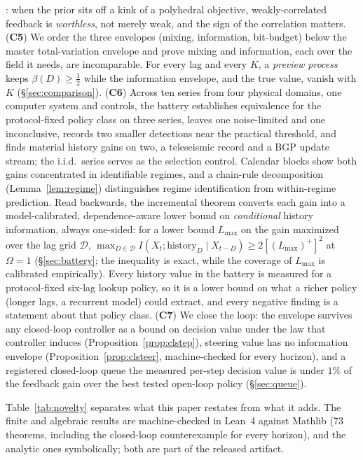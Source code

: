 \documentclass[acmsmall,screen,review,anonymous]{acmart}
\begin{document}
\cite{radnerstiglitz84,chadeschlee02}: when the prior sits off a kink of a polyhedral
objective, weakly-correlated feedback is \emph{worthless}, not merely weak,
and the sign of the correlation matters. (\textbf{C5}) We order the three
envelopes (mixing, information, bit-budget) below the master
total-variation envelope and prove mixing and information, each over the
field it needs, are incomparable.
For every lag and every $K$, a \emph{preview process} keeps
$\beta(D)\ge\tfrac12$ while the information envelope, and the true value,
vanish with $K$ (\S\ref{sec:comparison}). (\textbf{C6}) Across ten
series from four physical domains, one computer system and controls, the
battery establishes equivalence for the protocol-fixed policy class on
three series, leaves one noise-limited and one inconclusive, records two
smaller detections near the practical threshold, and finds material
history gains on two, a teleseismic record and a BGP update stream; the
i.i.d.\ series serves as the selection control. Calendar blocks show both gains
concentrated in identifiable regimes, and a chain-rule decomposition
(Lemma~\ref{lem:regime}) distinguishes regime identification from
within-regime prediction. Read backwards, the incremental theorem
converts each gain into a model-calibrated, dependence-aware lower bound
on \emph{conditional} history information, always one-sided: for a lower
bound $L_{\max}$ on the gain maximized over the lag grid $\mathcal D$,
$\max_{D\in\mathcal D}I(X_t;\text{history}_D\mid X_{t-D})\ge
2[(L_{\max})^{+}]^2$ at $\Omega=1$ (\S\ref{sec:battery}; the inequality is
exact, while the coverage of $L_{\max}$ is calibrated empirically). Every history value in the battery is measured for
a protocol-fixed six-lag lookup policy, so it is a lower bound on what a
richer policy (longer lags, a recurrent model) could extract, and every
negative finding is a statement about that policy class. (\textbf{C7}) We
close the loop: the envelope survives any closed-loop controller as a
bound on decision value under the law that controller induces
(Proposition~\ref{prop:clstep}), steering value has no information envelope
(Proposition~\ref{prop:clsteer}, machine-checked for every horizon), and a
registered closed-loop queue the measured per-step decision value is under
$1\%$ of the feedback gain over the best tested open-loop policy
(\S\ref{sec:queue}).

Table~\ref{tab:novelty} separates what this paper restates from what it adds. The
finite and algebraic results are machine-checked in Lean~4 against Mathlib
(73 theorems, including the closed-loop counterexample for every horizon),
and the analytic ones symbolically; both are part of the
released artifact.
\end{document}
